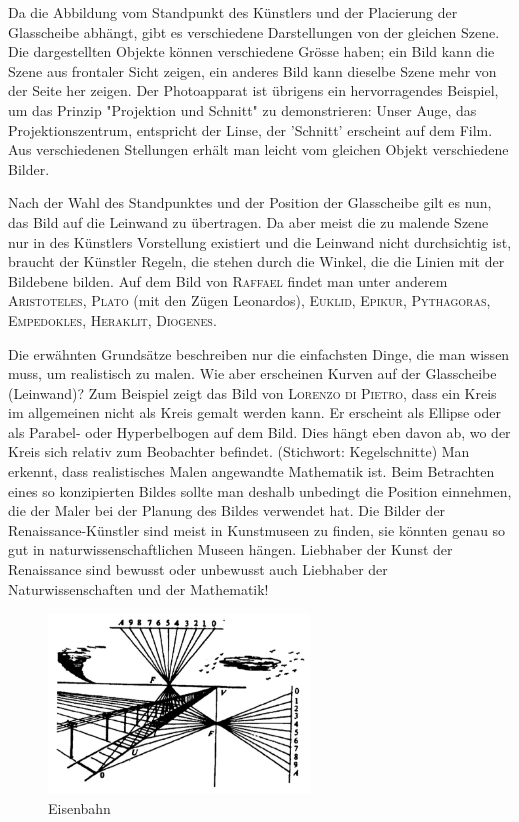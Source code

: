 \documentclass[%
11pt,%
twoside,%
titlepage,%
a4page,%
german,%
headsepline%
]{scrartcl}
\begin{document}
Da die Abbildung vom Standpunkt des K\"unstlers und der Placierung der Glasscheibe abh\"angt, gibt es verschiedene Darstellungen von der gleichen Szene. Die dargestellten Objekte k\"onnen verschiedene Gr\"osse haben; ein Bild kann die Szene aus frontaler Sicht zeigen, ein anderes Bild kann dieselbe Szene mehr von der Seite her zeigen. Der Photoapparat ist \"ubrigens ein hervorragendes Beispiel, um das Prinzip "Projektion und Schnitt" zu demonstrieren: Unser Auge, das Projektionszentrum, entspricht der Linse, der 'Schnitt' erscheint auf dem Film. Aus verschiedenen Stellungen erh\"alt man leicht vom gleichen Objekt verschiedene Bilder.

Nach der Wahl des Standpunktes und der Position der Glasscheibe gilt es nun, das Bild auf die Leinwand zu \"ubertragen. Da aber meist die zu malende Szene nur in des K\"unstlers Vorstellung existiert und die Leinwand nicht durchsichtig ist, braucht der K\"unstler Regeln, die stehen durch die Winkel, die die Linien mit der Bildebene bilden. Auf dem Bild von \textsc{Raffael} findet man unter anderem \textsc{Aristoteles, Plato} (mit den Z\"ugen Leonardos), \textsc{Euklid, Epikur, Pythagoras, Empedokles, Heraklit, Diogenes}.

Die erw\"ahnten Grunds\"atze beschreiben nur die einfachsten Dinge, die man wissen muss, um realistisch zu malen. Wie aber erscheinen Kurven auf der Glasscheibe (Leinwand)?
Zum Beispiel zeigt das Bild von \textsc{Lorenzo di Pietro}, dass ein Kreis im allgemeinen nicht als Kreis gemalt werden kann. Er erscheint als Ellipse oder als Parabel- oder Hyperbelbogen auf dem Bild. Dies h\"angt eben davon ab, wo der Kreis sich relativ zum Beobachter befindet. (Stichwort: Kegelschnitte)
Man erkennt, dass realistisches Malen angewandte Mathematik ist. Beim Betrachten eines so konzipierten Bildes sollte man deshalb unbedingt die Position einnehmen, die der Maler bei der Planung des Bildes verwendet hat. Die Bilder der Renaissance-K\"unstler sind meist in Kunstmuseen zu finden, sie k\"onnten genau so gut in naturwissenschaftlichen Museen h\"angen. Liebhaber der Kunst der Renaissance sind bewusst oder unbewusst auch Liebhaber der Naturwissenschaften und der Mathematik!

\begin{figure}[h!]
\begin{center}
\includegraphics[width=0.618\textwidth]{pictures/eisenbahn}
\end{center}
\caption{Eisenbahn}\label{eisenbahn}
\end{figure}
\end{document}
